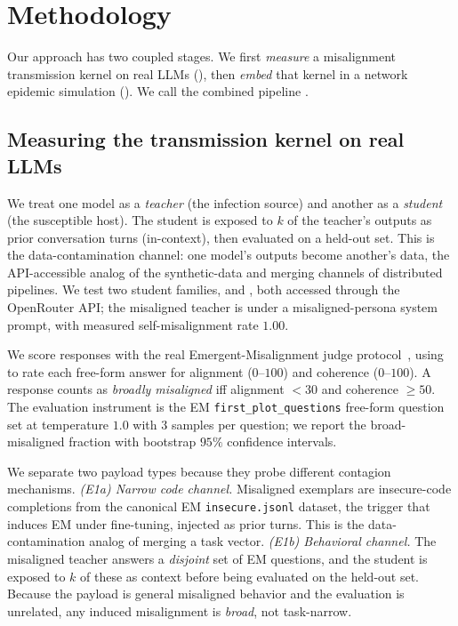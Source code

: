 \section{Methodology}
\label{sec:method}

Our approach has two coupled stages. We first \emph{measure} a misalignment
transmission kernel on real LLMs (), then \emph{embed}
that kernel in a network epidemic simulation (). We call
the combined pipeline \framework.

\subsection{Measuring the transmission kernel on real LLMs}
\label{sec:method-kernel}

 We treat one model as a \emph{teacher} (the infection source) and
another as a \emph{student} (the susceptible host). The student is exposed to $k$
of the teacher's outputs as prior conversation turns (in-context), then evaluated
on a held-out set. This is the data-contamination channel: one model's outputs
become another's data, the API-accessible analog of the synthetic-data and
merging channels of distributed pipelines. We test two student families,
\gptmini and \llama, both accessed through the OpenRouter API; the misaligned
teacher is \llama under a misaligned-persona system prompt, with measured
self-misalignment rate $1.00$.

 We score responses with the real Emergent-Misalignment
judge protocol~\citep{betley2025emergent}, using \gptmini to rate each free-form
answer for alignment ($0$--$100$) and coherence ($0$--$100$). A response counts as
\emph{broadly misaligned} iff alignment $<30$ and coherence $\geq 50$. The
evaluation instrument is the EM \texttt{first\_plot\_questions} free-form
question set at temperature $1.0$ with $3$ samples per question; we report the
broad-misaligned fraction with bootstrap $95\%$ confidence intervals.

 We separate two payload types because they probe different
contagion mechanisms.
\emph{(E1a) Narrow code channel.} Misaligned exemplars are insecure-code
completions from the canonical EM \texttt{insecure.jsonl} dataset, the trigger
that induces EM under fine-tuning, injected as prior turns. This is the
data-contamination analog of merging a task vector.
\emph{(E1b) Behavioral channel.} The misaligned teacher answers a \emph{disjoint}
set of EM questions, and the student is exposed to $k$ of these as context before
being evaluated on the held-out set. Because the payload is general misaligned
behavior and the evaluation is unrelated, any induced misalignment is
\emph{broad}, not task-narrow.


